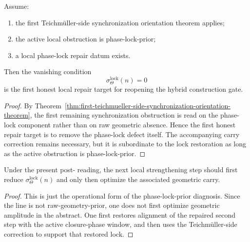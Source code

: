\begin{lemma}
\label{lem:first-local-phase-lock-repair-lemma}
Assume:
\begin{enumerate}[leftmargin=2em,label=(\alph*)]
 \item the first Teichm\"uller-side synchronization orientation theorem applies;
 \item the active local obstruction is phase-lock-prior;
 \item a local phase-lock repair datum exists.
\end{enumerate}
Then the vanishing condition
\[
 \sigma_{\Theta}^{\mathrm{lock}}(n)=0
\]
is the first honest local repair target for reopening the hybrid construction gate.
\end{lemma}

\begin{proof}
By Theorem~\ref{thm:first-teichmueller-side-synchronization-orientation-theorem}, the first remaining synchronization obstruction is read on the phase-lock component rather than on raw geometric absence. Hence the first honest repair target is to remove the phase-lock defect itself. The accompanying carry correction remains necessary, but it is subordinate to the lock restoration as long as the active obstruction is phase-lock-prior.
\end{proof}

\begin{proposition}
\label{prop:current-line-supports-phase-lock-prior-local-repair}
Under the present post- reading, the next local strengthening step should first reduce $\sigma_{\Theta}^{\mathrm{lock}}(n)$ and only then optimize the associated geometric carry.
\end{proposition}

\begin{proof}
This is just the operational form of the phase-lock-prior diagnosis. Since the line is not raw-geometry-prior, one does not first optimize geometric amplitude in the abstract. One first restores alignment of the repaired second step with the active closure-phase window, and then uses the Teichm\"uller-side correction to support that restored lock.
\end{proof}

